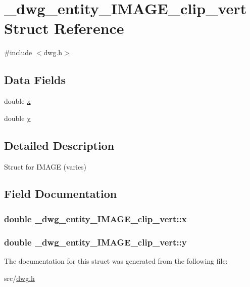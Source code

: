 \hypertarget{struct__dwg__entity__IMAGE__clip__vert}{\section{\-\_\-dwg\-\_\-entity\-\_\-\-I\-M\-A\-G\-E\-\_\-clip\-\_\-vert \-Struct \-Reference}
\label{struct__dwg__entity__IMAGE__clip__vert}
}


{\ttfamily \#include $<$dwg.\-h$>$}

\subsection*{\-Data \-Fields}
\begin{DoxyCompactItemize}
\item 
double \hyperlink{struct__dwg__entity__IMAGE__clip__vert_a9caf23a1f72e8c3a598bb4eadd3cd11b}{x}
\item 
double \hyperlink{struct__dwg__entity__IMAGE__clip__vert_a849088825c0641706a524439a11395cb}{y}
\end{DoxyCompactItemize}


\subsection{\-Detailed \-Description}
\-Struct for \-I\-M\-A\-G\-E (varies) 

\subsection{\-Field \-Documentation}
\hypertarget{struct__dwg__entity__IMAGE__clip__vert_a9caf23a1f72e8c3a598bb4eadd3cd11b}{
\subsubsection[{x}]{\setlength{\rightskip}{0pt plus 5cm}double {\bf \-\_\-dwg\-\_\-entity\-\_\-\-I\-M\-A\-G\-E\-\_\-clip\-\_\-vert\-::x}}}\label{struct__dwg__entity__IMAGE__clip__vert_a9caf23a1f72e8c3a598bb4eadd3cd11b}
\hypertarget{struct__dwg__entity__IMAGE__clip__vert_a849088825c0641706a524439a11395cb}{
\subsubsection[{y}]{\setlength{\rightskip}{0pt plus 5cm}double {\bf \-\_\-dwg\-\_\-entity\-\_\-\-I\-M\-A\-G\-E\-\_\-clip\-\_\-vert\-::y}}}\label{struct__dwg__entity__IMAGE__clip__vert_a849088825c0641706a524439a11395cb}


\-The documentation for this struct was generated from the following file\-:\begin{DoxyCompactItemize}
\item 
src/\hyperlink{dwg_8h}{dwg.\-h}\end{DoxyCompactItemize}
